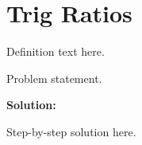 \section{Trig Ratios}


\begin{definition}[Term]
Definition text here.
\end{definition}

\begin{example}
Problem statement.

\textbf{Solution:}

Step-by-step solution here.
\end{example}
